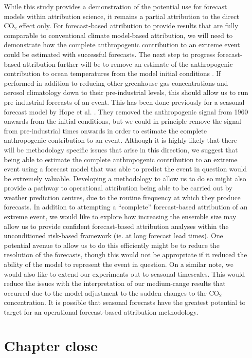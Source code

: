   While this study provides a demonstration of the potential use for forecast models within attribution science, it remains a partial attribution to the direct CO$_2$ effect only. For forecast-based attribution to provide results that are fully comparable to conventional climate model-based attribution, we will need to demonstrate how the complete anthropogenic contribution to an extreme event could be estimated with successful forecasts. The next step to progress forecast-based attribution further will be to remove an estimate of the anthropogenic contribution to ocean temperatures from the model initial conditions \citep[e.g.][]{stone_benchmark_2021}. If performed in addition to reducing other greenhouse gas concentrations and aerosol climatology down to their pre-industrial levels, this should allow us to run pre-industrial forecasts of an event. This has been done previously for a seasonal forecast model by Hope et al. \citep{hope_contributors_2015,hope_what_2016,hope_determining_2019}. They removed the anthropogenic signal from 1960 onwards from the initial conditions, but we could in principle remove the signal from pre-industrial times onwards in order to estimate the complete anthropogenic contribution to an event. Although it is highly likely that there will be methodology specific issues that arise in this direction, we suggest that being able to estimate the complete anthropogenic contribution to an extreme event using a forecast model that was able to predict the event in question would be extremely valuable. Developing a methodology to allow us to do so might also provide a pathway to operational attribution being able to be carried out by weather prediction centres, due to the routine frequency at which they produce forecasts. In addition to attempting a ``complete'' forecast-based attribution of an extreme event, we would like to explore how increasing the ensemble size may allow us to provide confident forecast-based attribution analyses within the unconditioned risk-based framework (ie. at long forecast lead times). One potential avenue to allow us to do this efficiently might be to reduce the resolution of the forecasts, though this would not be appropriate if it reduced the ability of the model to represent the event in question. On a similar note, we would also like to extend our experiments out to seasonal timescales. This would reduce the issues with the interpretation of our medium-range results that occurred due to the model adjustment to the sudden changes to the CO$_2$ concentration. It is possible that seasonal forecasts have the greatest potential to target for an operational forecast-based attribution methodology.

\section{Chapter close}